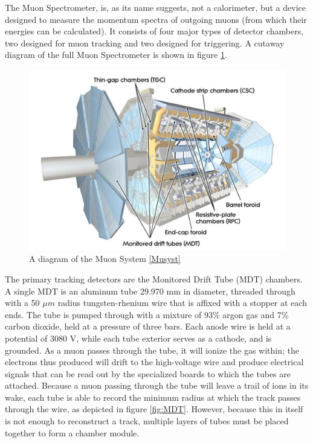 The Muon Spectrometer, is, as its name suggests, not a calorimeter, but a device designed to measure the momentum spectra of outgoing muons (from which their energies can be calculated). It consists of four major types of detector chambers, two designed for muon tracking and two designed for triggering. A cutaway diagram of the full Muon Spectrometer is shown in figure \ref{fig:MuSyst}.

\begin{figure}
  \includegraphics[width=\linewidth]{figures/detector_chapter/MuSyst.png}
  \caption{A diagram of the Muon System \ref{Musyst}}
  \label{fig:MuSyst}
\end{figure}

The primary tracking detectors are the Monitored Drift Tube (MDT) chambers. A single MDT is an aluminum tube 29.970 mm in diameter, threaded through with a 50 $\mu m$ radius tungsten-rhenium wire that is affixed with a stopper at each ends. The tube is pumped through with a mixture of 93\% argon gas and 7\% carbon dioxide, held at a pressure of three bars. Each anode wire is held at a potential of 3080 V, while each tube exterior serves as a cathode, and is grounded. As a muon passes through the tube, it will ionize the gas within; the electrons thus produced will drift to the high-voltage wire and produce electrical signals that can be read out by the specialized boards to which the tubes are attached. Because a muon passing through the tube will leave a trail of ions in its wake, each tube is able to record the minimum radius at which the track passes through the wire, as depicted in figure \ref{fig:MDT}. However, because this in itself is not enough to reconstruct a track, multiple layers of tubes must be placed together to form a chamber module.

